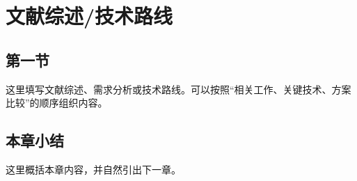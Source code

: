 \chapter{文献综述/技术路线}

\section{第一节}

这里填写文献综述、需求分析或技术路线。可以按照“相关工作、关键技术、方案比较”的顺序组织内容。

\section{本章小结}

这里概括本章内容，并自然引出下一章。
